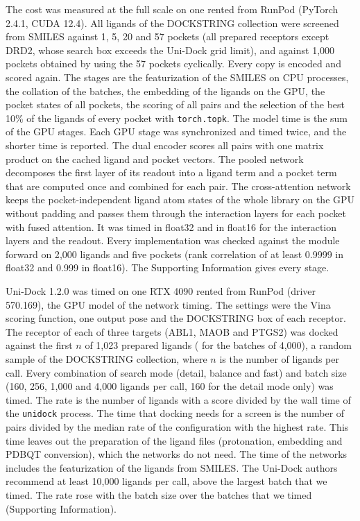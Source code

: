 The cost was measured at the full scale on one \tmAGpu{} rented from RunPod (PyTorch 2.4.1,\cite{paszke2019} CUDA 12.4). All \tmALig{} ligands of the DOCKSTRING collection were screened from SMILES against 1, 5, 20 and 57 pockets (all prepared receptors except DRD2, whose search box exceeds the Uni-Dock grid limit), and against 1{,}000 pockets obtained by using the 57 pockets cyclically. Every copy is encoded and scored again. The stages are the featurization of the SMILES on \tmAProcs{} CPU processes, the collation of the batches, the embedding of the ligands on the GPU, the pocket states of all pockets, the scoring of all pairs and the selection of the best 10\% of the ligands of every pocket with \texttt{torch.topk}. The model time is the sum of the GPU stages. Each GPU stage was synchronized and timed twice, and the shorter time is reported. The dual encoder scores all pairs with one matrix product on the cached ligand and pocket vectors. The pooled network decomposes the first layer of its readout into a ligand term and a pocket term that are computed once and combined for each pair. The cross-attention network keeps the pocket-independent ligand atom states of the whole library on the GPU without padding and passes them through the interaction layers for each pocket with fused attention. It was timed in float32 and in float16 for the interaction layers and the readout. Every implementation was checked against the module forward on 2{,}000 ligands and five pockets (rank correlation of at least 0.9999 in float32 and 0.999 in float16). The Supporting Information gives every stage.

Uni-Dock 1.2.0\cite{unidock} was timed on one RTX 4090 rented from RunPod (driver 570.169), the GPU model of the network timing. The settings were the Vina scoring function, one output pose and the DOCKSTRING box of each receptor. The receptor of each of three targets (ABL1, MAOB and PTGS2) was docked against the first $n$ of 1,023 prepared ligands (\dockPrepOkFourK{} for the batches of 4,000), a random sample of the DOCKSTRING collection, where $n$ is the number of ligands per call. Every combination of search mode (detail, balance and fast) and batch size (160, 256, 1,000 and 4,000 ligands per call, 160 for the detail mode only) was timed. The rate is the number of ligands with a score divided by the wall time of the \texttt{unidock} process. The time that docking needs for a screen is the number of pairs divided by the median rate of the configuration with the highest rate. This time leaves out the preparation of the ligand files (protonation, embedding and PDBQT conversion), which the networks do not need. The time of the networks includes the featurization of the ligands from SMILES. The Uni-Dock authors recommend at least 10{,}000 ligands per call, above the largest batch that we timed. The rate rose with the batch size over the batches that we timed (Supporting Information).

